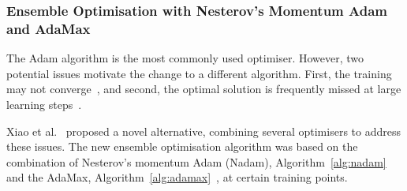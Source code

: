 %
\subsubsection{Ensemble Optimisation with Nesterov's Momentum Adam and AdaMax}
The Adam algorithm is the most commonly used optimiser.
However, two potential issues motivate the change to a different algorithm.
First, the training may not converge~\cite{reddi_convergence_2019}, and second, the optimal solution is frequently missed at large learning steps~\cite{wilson_marginal_2017}.

Xiao et al.~\cite{xiao_accurate_2019} proposed a novel alternative, combining several optimisers to address these issues.
The new ensemble optimisation algorithm was based on the combination of Nesterov's momentum Adam (Nadam), \mbox{Algorithm~\ref{alg:nadam}}~\cite{dozat_nadam_2016} and the AdaMax, \mbox{Algorithm~\ref{alg:adamax}}~\cite{kingma_adam_2017}, at certain training points.

